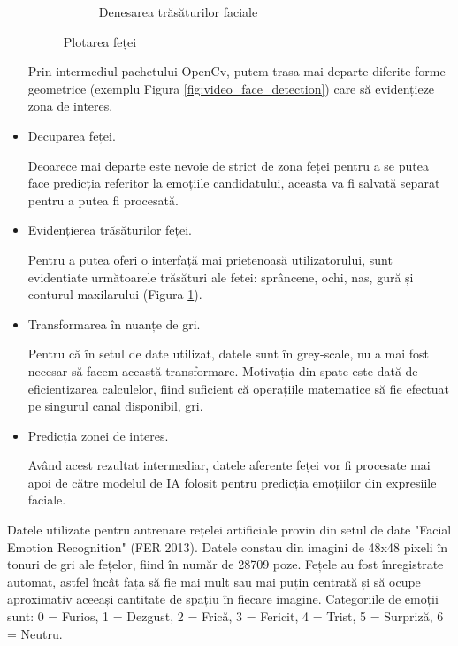 \documentclass[a4paper, 12pt]{report}
\begin{document}
\begin{itemize}
\begin{figure}[H]
\begin{subfigure}[b]{0.425\textwidth}
				\caption{Denesarea trăsăturilor faciale}
				\label{fig:video_face_features}
			\end{subfigure}
			\caption{Plotarea feței}
			\label{fig:face}
		\end{figure}
	
		Prin intermediul pachetului OpenCv, putem trasa mai departe diferite forme geometrice (exemplu Figura \ref{fig:video_face_detection}) care să evidențieze zona de interes.
		
		\item Decuparea feței.
		
		Deoarece mai departe este nevoie de strict de zona feței pentru a se putea face predicția referitor la emoțiile candidatului, aceasta va fi salvată separat pentru a putea fi procesată. 
		
		\item Evidențierea trăsăturilor feței.
		
		Pentru a putea oferi o interfață mai prietenoasă utilizatorului, sunt evidențiate următoarele trăsături ale fetei: sprâncene, ochi, nas, gură și conturul maxilarului (Figura \ref{fig:video_face_features}). 
		
		\item Transformarea în nuanțe de gri.
		
		Pentru că în setul de date utilizat, datele sunt în grey-scale, nu a mai fost necesar să facem această transformare. Motivația din spate este dată de eficientizarea calculelor, fiind suficient că operațiile matematice să fie efectuat pe singurul canal disponibil, gri.
		
		\item Predicția zonei de interes.
		
		Având acest rezultat intermediar, datele aferente feței vor fi procesate mai apoi de către modelul de IA folosit pentru predicția emoțiilor din expresiile faciale.
		
	\end{itemize}
	
	Datele utilizate pentru antrenare rețelei artificiale provin din setul de date "Facial Emotion Recognition" (FER 2013). Datele constau din imagini de 48x48 pixeli în tonuri de gri ale fețelor, fiind în număr de 28709 poze. Fețele au fost înregistrate automat, astfel încât fața să fie mai mult sau mai puțin centrată și să ocupe aproximativ aceeași cantitate de spațiu în fiecare imagine. Categoriile de emoții sunt: 0 = Furios, 1 = Dezgust, 2 = Frică, 3 = Fericit, 4 = Trist, 5 = Surpriză, 6 = Neutru.
	
\end{document}
